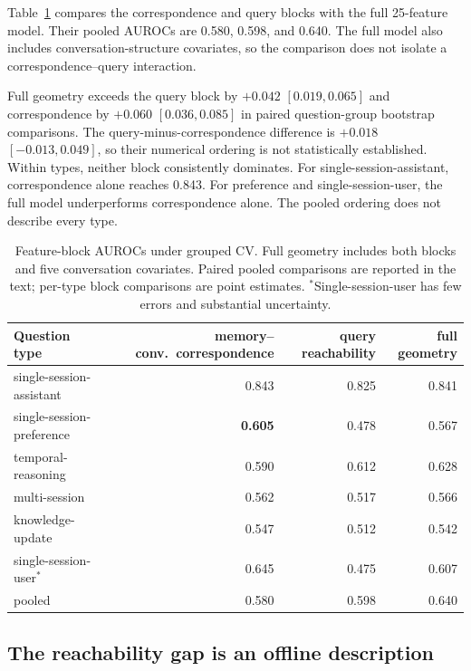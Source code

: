 \documentclass{article}
\begin{document}
Table~\ref{tab:decomp} compares the correspondence and query blocks with the
full 25-feature model. Their pooled AUROCs are 0.580, 0.598, and 0.640.
The full model also includes conversation-structure covariates,
so the comparison does not isolate a correspondence--query interaction.

Full geometry exceeds the query block by $+0.042$ $[0.019,0.065]$
and correspondence by $+0.060$ $[0.036,0.085]$ in paired
question-group bootstrap comparisons.
The query-minus-correspondence difference is $+0.018$ $[-0.013,0.049]$,
so their numerical ordering is not statistically established.
Within types, neither block consistently dominates.
For single-session-assistant, correspondence alone reaches 0.843.
For preference and single-session-user, the full model underperforms
correspondence alone. The pooled ordering does not describe every type.

\begin{table}[h]
  \centering\small
  \caption{Feature-block AUROCs under grouped CV. Full geometry includes both
  blocks and five conversation covariates. Paired pooled comparisons are
  reported in the text; per-type block comparisons are point estimates.
  $^{*}$Single-session-user has few errors and substantial uncertainty.}
  \label{tab:decomp}
  \begin{tabular}{lrrr}
    \toprule
    Question type & memory--conv.\ correspondence & query reachability & full geometry \\
    \midrule
    single-session-assistant  & 0.843 & 0.825 & 0.841 \\
    single-session-preference & \textbf{0.605} & 0.478 & 0.567 \\
    temporal-reasoning        & 0.590 & 0.612 & 0.628 \\
    multi-session             & 0.562 & 0.517 & 0.566 \\
    knowledge-update          & 0.547 & 0.512 & 0.542 \\
    single-session-user$^{*}$ & 0.645 & 0.475 & 0.607 \\
    \midrule
    pooled                    & 0.580 & 0.598 & 0.640 \\
    \bottomrule
  \end{tabular}
\end{table}

\subsection{The reachability gap is an offline description}
\label{sec:scope}
\end{document}
